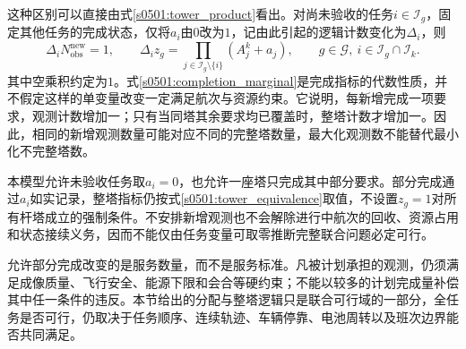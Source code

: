这种区别可以直接由式\eqref{s0501:tower_product}看出。对尚未验收的任务$i\in\mathcal I_g$，固定其他任务的完成状态，仅将$a_i$由$0$改为$1$，记由此引起的逻辑计数变化为$\Delta_i$，则
\begin{equation}
 \Delta_i N_{\mathrm{obs}}^{\mathrm{new}}=1,\qquad
 \Delta_i z_g=
 \prod_{j\in\mathcal I_g\setminus\{i\}}(A_j^k+a_j),
 \qquad g\in\mathcal G,\ i\in\mathcal I_g\cap\mathcal I_k.
 \label{s0501:completion_marginal}
\end{equation}
其中空乘积约定为$1$。式\eqref{s0501:completion_marginal}是完成指标的代数性质，并不假定这样的单变量改变一定满足航次与资源约束。它说明，每新增完成一项要求，观测计数增加一；只有当同塔其余要求均已覆盖时，整塔计数才增加一。因此，相同的新增观测数量可能对应不同的完整塔数量，最大化观测数不能替代最小化不完整塔数。

本模型允许未验收任务取$a_i=0$，也允许一座塔只完成其中部分要求。部分完成通过$a_i$如实记录，整塔指标仍按式\eqref{s0501:tower_equivalence}取值，不设置$z_g=1$对所有杆塔成立的强制条件。不安排新增观测也不会解除进行中航次的回收、资源占用和状态接续义务，因而不能仅由任务变量可取零推断完整联合问题必定可行。

允许部分完成改变的是服务数量，而不是服务标准。凡被计划承担的观测，仍须满足成像质量、飞行安全、能源下限和会合等硬约束；不能以较多的计划完成量补偿其中任一条件的违反。本节给出的分配与整塔逻辑只是联合可行域的一部分，全任务是否可行，仍取决于任务顺序、连续轨迹、车辆停靠、电池周转以及班次边界能否共同满足。